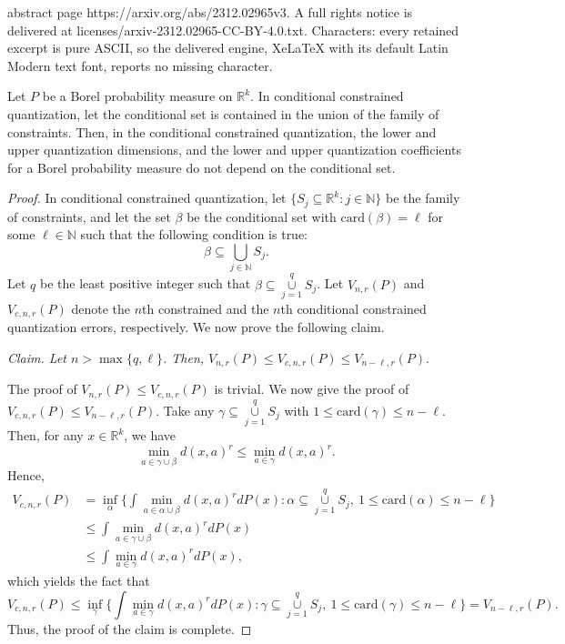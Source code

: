 \documentclass[10pt,a4paper]{amsart}
\newcommand{\D}[1]{\mathbb{#1}}%
\newcommand{\UU}{\bigcup}%
\newcommand{\ci}{\subseteq}%
\newcommand{\ga}{\alpha}
\newcommand{\gb}{\beta}
\newcommand{\set}[1]{\{#1\}}%
\newcommand{\te}{\text}%
\newcommand{\tit}{\textit}%
\newcommand{\uu}{\cup}%
\renewcommand{\gg}{\gamma}%
\begin{document}
abstract page https://arxiv.org/abs/2312.02965v3. A full rights notice is delivered at licenses/arxiv-2312.02965-CC-BY-4.0.txt. Characters: every retained excerpt is pure ASCII, so the delivered engine, XeLaTeX with its default Latin Modern text font, reports no missing character.
\begin{theorem} \label{TheoM2} 
Let $P$ be a Borel probability measure on $\D R^k$. In conditional constrained quantization, let the conditional set is contained in the union of the family of constraints. Then, in the conditional constrained quantization, the lower and upper quantization dimensions, and the lower and upper quantization coefficients for a Borel probability measure do not depend on the conditional set. 
\end{theorem} 

\begin{proof} 
In conditional constrained quantization, let $\set{S_j\ci \D R^k: j\in \D N}$ be the family of constraints, and let the set $\gb$ be the conditional set with $\te{card}(\gb)=\ell$ for some $\ell\in \D N$ such that the following condition is true: 
\begin{equation*}
\gb \ci \UU_{j\in \D N} S_j.
\end{equation*}
Let $q$ be the least positive integer such that $\gb\ci \mathop{\uu}\limits_{j=1}^q S_j$.  
Let  $ V_{n,r}(P)$ and  $V_{c,n,r}(P)$ denote  the $n$th constrained  and the $n$th conditional constrained quantization  errors, respectively. 
We now prove the following claim.

\tit{Claim.  Let $n> \max \set{q, \ell}$. Then, 
$V_{n,r}(P)\leq V_{c, n,r}(P)\leq V_{n-\ell,r}(P).$}

The proof of $V_{n,r}(P)\leq V_{c, n,r}(P)$ is trivial. We now give the proof of $V_{c, n,r}(P)\leq V_{n-\ell,r}(P)$. 
Take any $\gg\ci \mathop{\uu}\limits_{j=1}^q S_j$ with $1\leq \te{card}(\gg)\leq n-\ell$. Then, for any $x\in \D R^k$, we have 
\[\min_{a\in \gg\uu \gb}d(x, a)^r \leq \min_{a\in \gg} d(x, a)^r.\]
Hence, 
\begin{align*} 
V_{c, n, r}(P)&=\inf_{\ga} \Big\{\int \mathop{\min}\limits_{a\in\ga\uu\gb} d(x, a)^r dP(x) : \ga \ci \mathop{\uu}\limits_{j=1}^q S_j, ~ 1\leq  \text{card}(\ga) \leq n-\ell \Big\}\\
&\leq \int \mathop{\min}\limits_{a\in\gg\uu\gb} d(x, a)^r dP(x)\\
&\leq \int \mathop{\min}\limits_{a\in\gg} d(x, a)^r dP(x),
\end{align*} 
which yields the fact that 
\[V_{c, n, r}(P)\leq \inf_{\gg} \Big\{\int \mathop{\min}\limits_{a\in\gg } d(x, a)^r dP(x) : \gg\ci \mathop{\uu}\limits_{j=1}^q S_j, ~ 1\leq  \text{card}(\gg) \leq n-\ell \Big\}=V_{n-\ell, r}(P).\]
Thus, the proof of the claim is complete. 


\end{proof}
\end{document}
